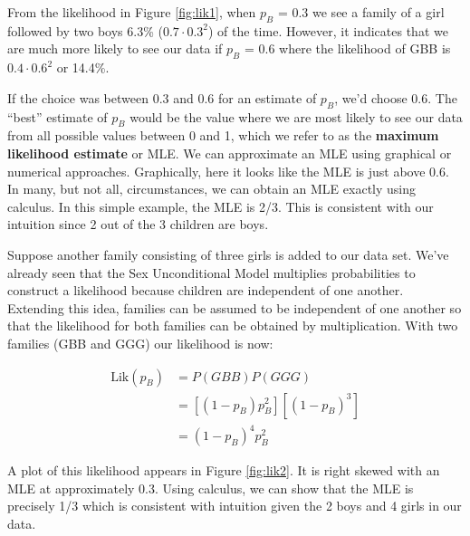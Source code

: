 \documentclass[
]{krantz}
\newcommand{\lik}{\mathrm{Lik}}
\begin{document}
From the likelihood in Figure \ref{fig:lik1}, when \(p_B\) = 0.3 we see a family of a girl followed by two boys 6.3\% (\(0.7\cdot0.3^2\)) of the time. However, it indicates that we are much more likely to see our data if \(p_B\) = 0.6 where the likelihood of GBB is \(0.4\cdot0.6^2\) or 14.4\%.

If the choice was between 0.3 and 0.6 for an estimate of \(p_B\), we'd choose 0.6. The ``best'' estimate of \(p_B\) would be the value where we are most likely to see our data from all possible values between 0 and 1, which we refer to as the \textbf{maximum likelihood estimate} or MLE.  We can approximate an MLE using graphical or numerical approaches. Graphically, here it looks like the MLE is just above 0.6. In many, but not all, circumstances, we can obtain an MLE exactly using calculus. In this simple example, the MLE is 2/3. This is consistent with our intuition since 2 out of the 3 children are boys.

Suppose another family consisting of three girls is added to our data set. We've already seen that the Sex Unconditional Model multiplies probabilities to construct a likelihood because children are independent of one another. Extending this idea, families can be assumed to be independent of one another so that the likelihood for both families can be obtained by multiplication. With two families (GBB and GGG) our likelihood is now:

\begin{align*}
 \lik (p_B) &= P(GBB)P(GGG) \\
            &= [(1-p_B)p_B^2][(1-p_B)^3] \\
            &= (1-p_B)^4p_B^2
\end{align*}

A plot of this likelihood appears in Figure \ref{fig:lik2}. It is right skewed with an MLE at approximately 0.3. Using calculus, we can show that the MLE is precisely 1/3 which is consistent with intuition given the 2 boys and 4 girls in our data.
\end{document}
